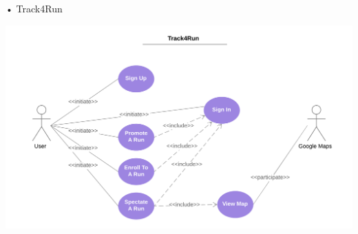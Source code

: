 \begin{enumerate}
\begin{minipage}{\textwidth}
\item[•]{\Large Track4Run}
\FloatBarrier
\begin{center}
\includegraphics[scale=0.70]{Images/Track4RunCaseDiagram.png}
\end{center}
\FloatBarrier
\end{minipage}
\end{enumerate}

